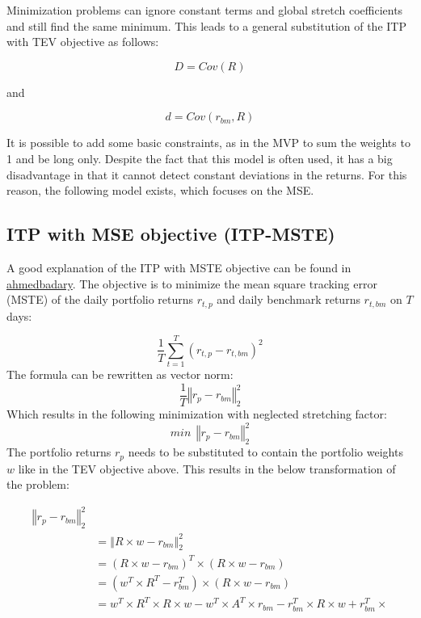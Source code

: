 \documentclass[
  oneside]{book}
\begin{document}
Minimization problems can ignore constant terms and global stretch coefficients and still find the same minimum. This leads to a general substitution of the ITP with TEV objective as follows:

\[
  D = Cov(R)
\]

and

\[
d = Cov(r_{bm}, R)
\]

It is possible to add some basic constraints, as in the MVP to sum the weights to 1 and be long only. Despite the fact that this model is often used, it has a big disadvantage in that it cannot detect constant deviations in the returns. For this reason, the following model exists, which focuses on the MSE.

\hypertarget{itp-with-mse-objective-itp-mste}{%
\subsection{ITP with MSE objective (ITP-MSTE)}\label{itp-with-mse-objective-itp-mste}}

A good explanation of the ITP with MSTE objective can be found in \href{https://ahmedbadary.github.io/work_files/research/conv_opt/hw/iftp}{ahmedbadary}. The objective is to minimize the mean square tracking error (MSTE) of the daily portfolio returns \(r_{t, p}\) and daily benchmark returns \(r_{t, bm}\) on \(T\) days:

\[
  \frac{1}{T} \sum^T_{t=1}(r_{t, p}-r_{t, bm})^2
\]
The formula can be rewritten as vector norm:
\[
  \frac{1}{T} \left\Vert r_{p}-r_{bm} \right\Vert_2^2
\]
Which results in the following minimization with neglected stretching factor:
\[
 min \ \  \left\Vert r_{p}-r_{bm} \right\Vert_2^2
\]
The portfolio returns \(r_p\) needs to be substituted to contain the portfolio weights \(w\) like in the TEV objective above. This results in the below transformation of the problem:

\begin{align*}
  \left\Vert r_{p}-r_{bm} \right\Vert_2^2 \\
  &= \left\Vert R \times w-r_{bm} \right\Vert_2^2 \\ 
  &= (R \times w-r_{bm})^T \times (R \times w-r_{bm}) \\ 
  &= (w^T \times R^T-r_{bm}^T) \times (R \times w-r_{bm}) \\ 
  &= w^T \times R^T \times R \times w - w^T \times A^T \times r_{bm} - r_{bm}^T \times R \times w + r_{bm}^T \times \end{align*}
\end{document}
